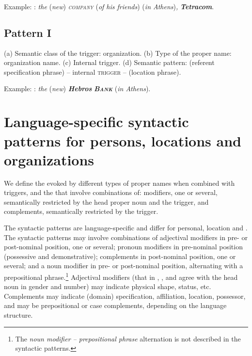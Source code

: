 \documentclass[output=paper]{langsci/langscibook}
\newcommand{\trigger}[1]{\textsc{#1}}
\begin{document}
Example: :\textit{ the }(\textit{new})\textit{
}\textit{\trigger{company}}\textit{ }(\textit{of his friends})
(\textit{in Athens})\textit{,} \textbf{\textit{Tetracom}}.

\subsection{Pattern I}

(a) Semantic class of the trigger: organization. (b) Type of the proper
name: organization name. (c) Internal trigger. (d) Semantic pattern:
(referent specification phrase) – internal \trigger{trigger} – (location
phrase).



Example: : \textit{the }(\textit{new}) \textbf{\textit{Hebros}}
\textbf{\textit{\trigger{Bank}}} (\textit{in Athens}).




\section{Language-specific syntactic patterns for persons, locations and organizations}



We define the  evoked by different types of proper
names when combined with triggers, and the  that
involve combinations of: modifiers, one or several, semantically
restricted by the head proper noun and the trigger, and complements,
semantically restricted by the trigger.

The syntactic patterns are language-specific and differ for personal,
location and . The syntactic patterns may involve
combinations of adjectival modifiers in pre- or post-nominal position,
one or several; pronoun modifiers in pre-nominal position (possessive
and demonstrative); complements in post-nominal position, one or
several; and a noun modifier in pre- or post-nominal position,
alternating with a prepositional
phrase.\footnote{The \textit{noun modifier – prepositional phrase} alternation
is not described in the syntactic patterns.} Adjectival modifiers (that in ,
,  and  agree with the head noun in gender and
number) may indicate physical shape, status, etc. Complements may
indicate (domain) specification, affiliation, location, possessor, and
may be prepositional or case complements, depending on the language
structure.
\end{document}
